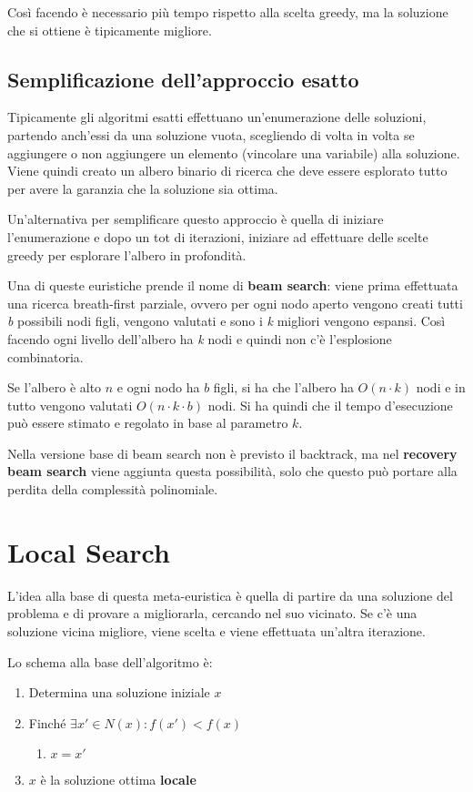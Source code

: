 Così facendo è necessario più tempo rispetto alla scelta greedy, ma la soluzione che si ottiene è tipicamente migliore.


\subsection{Semplificazione dell'approccio esatto}

Tipicamente gli algoritmi esatti effettuano un'enumerazione delle soluzioni, partendo anch'essi da una soluzione vuota, scegliendo di volta in volta se aggiungere o non aggiungere un elemento (vincolare una variabile) alla soluzione. Viene quindi creato un albero binario di ricerca che deve essere esplorato tutto per avere la garanzia che la soluzione sia ottima.

Un'alternativa per semplificare questo approccio è quella di iniziare l'enumerazione e dopo un tot di iterazioni, iniziare ad effettuare delle scelte greedy per esplorare l'albero in profondità.

Una di queste euristiche prende il nome di \textbf{beam search}: viene prima effettuata una ricerca breath-first parziale, ovvero per ogni nodo aperto vengono creati tutti \textit{b} possibili nodi figli, vengono valutati e sono i \textit{k} migliori vengono espansi.
Così facendo ogni livello dell'albero ha \textit{k} nodi e quindi non c'è l'esplosione combinatoria.

Se l'albero è alto $n$ e ogni nodo ha $b$ figli, si ha che l'albero ha $O(n \cdot k)$ nodi e in tutto vengono valutati $O(n\cdot k \cdot b)$ nodi.
Si ha quindi che il tempo d'esecuzione può essere stimato e regolato in base al parametro $k$.

Nella versione base di beam search non è previsto il backtrack, ma nel \textbf{recovery beam search} viene aggiunta questa possibilità, solo che questo può portare alla perdita della complessità polinomiale.

\section{Local Search}

L'idea alla base di questa meta-euristica è quella di partire da una soluzione del problema e di provare a migliorarla, cercando nel suo vicinato.
Se c'è una soluzione vicina migliore, viene scelta e viene effettuata un'altra iterazione.

Lo schema alla base dell'algoritmo è:

\begin{enumerate}
	\item Determina una soluzione iniziale $x$
	\item Finché $\exists x' \in N(x) : f(x') < f(x) $
	\begin{enumerate}
		\item $x = x'$
	\end{enumerate}
	\item $x$ è la soluzione ottima \textbf{locale}
\end{enumerate}

